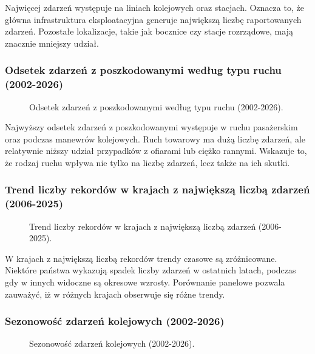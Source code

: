\documentclass[12pt]{article}
\begin{document}
Najwięcej zdarzeń występuje na liniach kolejowych oraz stacjach. Oznacza to, że główna infrastruktura eksploatacyjna generuje największą liczbę raportowanych zdarzeń. Pozostałe lokalizacje, takie jak bocznice czy stacje rozrządowe, mają znacznie mniejszy udział.

\subsubsection{Odsetek zdarzeń z poszkodowanymi według typu ruchu (2002-2026)}
\begin{figure}[H]
    \centering
    
    \caption{Odsetek zdarzeń z poszkodowanymi według typu ruchu (2002-2026).}
\end{figure}


Najwyższy odsetek zdarzeń z poszkodowanymi występuje w ruchu pasażerskim oraz podczas manewrów kolejowych. Ruch towarowy ma dużą liczbę zdarzeń, ale relatywnie niższy udział przypadków z ofiarami lub ciężko rannymi. Wskazuje to, że rodzaj ruchu wpływa nie tylko na liczbę zdarzeń, lecz także na ich skutki.

\subsubsection{Trend liczby rekordów w krajach z największą liczbą zdarzeń (2006-2025)}
\begin{figure}[H]
    \centering
    
    \caption{Trend liczby rekordów w krajach z największą liczbą zdarzeń (2006-2025).}
\end{figure}


W krajach z największą liczbą rekordów trendy czasowe są zróżnicowane. Niektóre państwa wykazują spadek liczby zdarzeń w ostatnich latach, podczas gdy w innych widoczne są okresowe wzrosty. Porównanie panelowe pozwala zauważyć, iż w różnych krajach obserwuje się różne trendy.

\subsubsection{Sezonowość zdarzeń kolejowych (2002-2026)}
\begin{figure}[H]
    \centering
    
    \caption{Sezonowość zdarzeń kolejowych (2002-2026).}
\end{figure}
\end{document}
